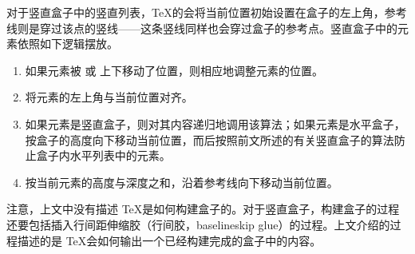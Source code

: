 \documentclass{book}
\begin{document}
对于竖直盒子中的竖直列表，\TeX 的会将当前位置初始设置在盒子的左上角，参考线则是穿过该点的竖线——这条竖线同样也会穿过盒子的参考点。竖直盒子中的元素依照如下逻辑摆放。
\begin{enumerate}
\item 如果元素被  或  上下移动了位置，则相应地调整元素的位置。
\item 将元素的左上角与当前位置对齐。
\item 如果元素是竖直盒子，则对其内容递归地调用该算法；如果元素是水平盒子，按盒子的高度向下移动当前位置，而后按照前文所述的有关竖直盒子的算法防止盒子内水平列表中的元素。
\item 按当前元素的高度与深度之和，沿着参考线向下移动当前位置。
\end{enumerate}
注意，上文中没有描述 \TeX 是如何构建盒子的。对于竖直盒子，构建盒子的过程还要包括插入行间距伸缩胶（行间胶，baselineskip glue）的过程。上文介绍的过程描述的是 \TeX 会如何输出一个已经构建完成的盒子中的内容。

\end{document}
